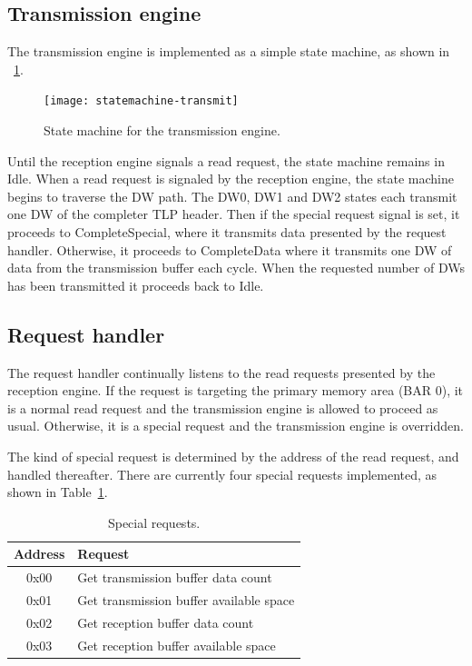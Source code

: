 \subsection{Transmission engine}

The transmission engine is implemented as a simple state machine, as shown in \figurename~\ref{fig:statemachine-transmit}.

\begin{figure}[!ht]
    \centering
    \texttt{[image: statemachine-transmit]}
    \caption[Transmission engine state machine]{
        State machine for the transmission engine.
    }
    \label{fig:statemachine-transmit}
\end{figure}

Until the reception engine signals a read request, the state machine remains in Idle.
When a read request is signaled by the reception engine, the state machine begins to traverse the DW path.
The DW0, DW1 and DW2 states each transmit one DW of the completer TLP header.
Then if the special request signal is set, it proceeds to CompleteSpecial, where it transmits data presented by the request handler.
Otherwise, it proceeds to CompleteData where it transmits one DW of data from the transmission buffer each cycle.
When the requested number of DWs has been transmitted it proceeds back to Idle.

\subsection{Request handler}

The request handler continually listens to the read requests presented by the reception engine.
If the request is targeting the primary memory area (BAR 0), it is a normal read request and the transmission engine is allowed to proceed as usual.
Otherwise, it is a special request and the transmission engine is overridden.

The kind of special request is determined by the address of the read request, and handled thereafter.
There are currently four special requests implemented, as shown in Table~\ref{tab:requests}.

\begin{table}[!ht]
    \renewcommand{\arraystretch}{1.3}
    \centering
    \begin{tabular}{c|l}
        \bfseries Address & \bfseries Request \\
        \hline
        0x00 & Get transmission buffer data count \\
        0x01 & Get transmission buffer available space \\
        0x02 & Get reception buffer data count \\
        0x03 & Get reception buffer available space \\
    \end{tabular}
    \caption{Special requests.}
    \label{tab:requests}
\end{table}

